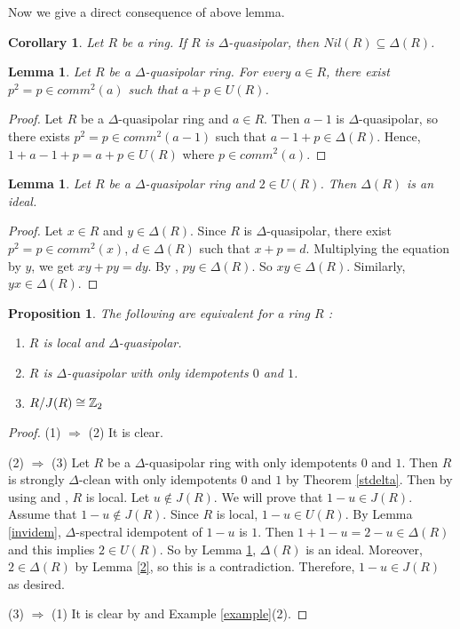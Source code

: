 \documentclass[12pt, reqno]{amsart}
\newtheorem{cor}[thm]{Corollary}
\newtheorem{lem}[thm]{Lemma}
\newtheorem{prop}[thm]{Proposition}
\numberwithin{equation}{section}
\begin{document}
Now we give a direct consequence of above lemma.

\begin{cor}
    Let $R$ be a ring. If $R$ is $\Delta$-quasipolar, then $Nil(R)\subseteq \Delta(R)$.
\end{cor}



\begin{lem}
    Let $R$ be a $\Delta$-quasipolar ring. For every $a\in R$, there exist $p^2=p\in comm^2(a)$ such that $a+p\in U(R)$.
\end{lem}



\begin{proof}
    Let $R$ be a $\Delta$-quasipolar ring and $a\in R$. Then $a-1$ is $\Delta$-quasipolar, so there exists $p^2=p\in comm^2(a-1)$ such that $a-1+p\in \Delta(R)$. Hence, $1+a-1+p=a+p\in U(R)$ where $p\in comm^2(a)$.
\end{proof}

\begin{lem}\label{deltaideal}
    Let $R$ be a $\Delta$-quasipolar ring and $2\in U(R)$. Then $\Delta(R)$ is an ideal.
\end{lem}

\begin{proof}
    Let $x\in R$ and $y\in \Delta(R)$. Since $R$ is $\Delta$-quasipolar, there exist $p^2=p\in comm^2(x)$, $d\in \Delta(R)$ such that $x+p=d$. Multiplying the equation by $y$, we get $xy+py=dy$. By \cite[Corollary 2]{Leroy}, $py\in \Delta(R)$. So $xy\in \Delta(R)$. Similarly, $yx\in \Delta(R)$.
\end{proof}

\begin{prop}
    The following are equivalent for a ring $R$ :
    \begin{enumerate}
        \item $R$ is local and $\Delta$-quasipolar.
        \item $R$ is $\Delta$-quasipolar with only idempotents $0$ and $1$.
        \item $R/J(R)\cong \Bbb{Z}_2$ 
    \end{enumerate}
\end{prop}

\begin{proof}
   (1) $\Rightarrow$ (2) It is clear.
   
   (2) $\Rightarrow$ (3) Let $R$ be a $\Delta$-quasipolar ring with only idempotents $0$ and $1$. Then $R$ is strongly $\Delta$-clean with only idempotents $0$ and $1$ by Theorem \ref{stdelta}. Then by using \cite[Lemma 2.4]{Danchev} and \cite[Lemma 14]{Nicholson}, $R$ is local. Let $u\notin J(R)$. We will prove that $1-u\in J(R)$. Assume that $1-u\notin J(R)$. Since $R$ is local, $1-u\in U(R)$. By Lemma \ref{invidem}, $\Delta$-spectral idempotent of $1-u$ is $1$. Then $1+1-u=2-u\in \Delta(R)$ and this implies $2\in U(R)$. So by Lemma \ref{deltaideal}, $\Delta(R)$ is an ideal. Moreover, $2\in \Delta(R)$ by Lemma \ref{2}, so this is a contradiction. Therefore, $1-u\in J(R)$ as desired.

   (3) $\Rightarrow$ (1) It is clear by \cite[Proposition 2.11]{Cui} and Example \ref{example}(2).\end{proof}
\end{document}
